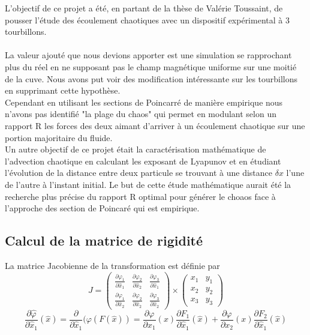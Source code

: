 \documentclass[a4paper,12pt,titlepage]{report}
\begin{document}
\begin{onehalfspace}
L'objectif de ce projet a été, en partant de la thèse de Valérie Toussaint, de pousser l'étude des écoulement chaotiques avec un dispositif expérimental à 3 tourbillons. \\
\\
La valeur ajouté que nous devions apporter est une simulation se rapprochant plus du réel en ne supposant pas le champ magnétique uniforme sur une moitié de la cuve. Nous avons put voir des modification intéressante sur les  tourbillons en supprimant cette hypothèse.\\
Cependant en utilisant les sections de Poincarré de manière empirique nous n'avons pas identifié "la plage du chaos" qui permet en modulant selon un rapport R les forces des deux aimant d'arriver à un écoulement chaotique sur une portion majoritaire du fluide. \\
Un autre objectif de ce projet était la caractérisation mathématique de l'advection chaotique en calculant les exposant de Lyapunov et en étudiant l'évolution de la distance entre deux particule se trouvant à une distance $\delta x$ l'une de l'autre à l'instant initial. Le but de cette étude mathématique aurait été la recherche plus précise du rapport R optimal pour générer le choaos face à l'approche des section de Poincaré qui est empirique.

\begin{appendix}

\chapter{Calcul de la matrice de rigidité}
\label{annexe_1}

La matrice Jacobienne de la transformation est définie par
\[	
J =
\begin{pmatrix}
  \frac{\partial\varphi_{1}}{\partial \hat{x}_{1}} & \frac{\partial\varphi_{2}}{\partial \hat{x}_{2}}  & \frac{\partial\varphi_{3}}{\partial \hat{x}_{1}}\\ 
  \frac{\partial\varphi_{1}}{\partial \hat{x}_{2}} & \frac{\partial \varphi_{2}}{\partial \hat{x}_{2}} & \frac{\partial\varphi_{3}}{\partial \hat{x}_{2}} 
\end{pmatrix} 
\times
\begin{pmatrix}
   x_{1} &  y_{1} \\
   x_{2} &  y_{2} \\
   x_{3} &  y_{3}
\end{pmatrix}
\]
\[
\frac{\partial \hat{\varphi}}{\partial \hat{x}_{1}}(\hat{x}) = 
\frac{\partial}{\partial \hat{x}_{1}}(\varphi(F(\hat{x})) = 
\frac{\partial \varphi}{\partial x_{1}}(x) \frac{\partial F_{1}}{\partial \hat{x}_{1}}(\hat{x}) +
\frac{\partial \varphi}{\partial x_{2}}(x) \frac{\partial F_{2}}{\partial \hat{x}_{1}}(\hat{x})
\]


\end{appendix}
\end{onehalfspace}
\end{document}
